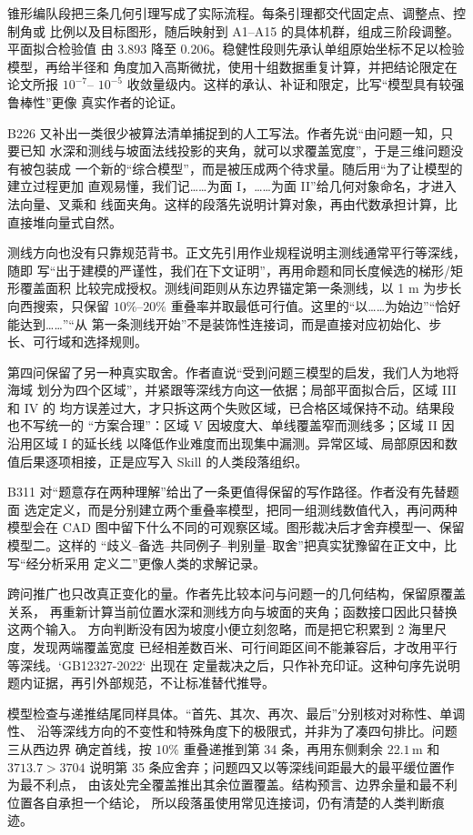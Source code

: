 锥形编队段把三条几何引理写成了实际流程。每条引理都交代固定点、调整点、控制角或
比例以及目标图形，随后映射到 A1--A15 的具体机群，组成三阶段调整。平面拟合检验值
由 $3.893$ 降至 $0.206$。稳健性段则先承认单组原始坐标不足以检验模型，再给半径和
角度加入高斯微扰，使用十组数据重复计算，并把结论限定在论文所报 $10^{-7}$--
$10^{-5}$ 收敛量级内。这样的承认、补证和限定，比写“模型具有较强鲁棒性”更像
真实作者的论证。

B226 又补出一类很少被算法清单捕捉到的人工写法。作者先说“由问题一知，只要已知
水深和测线与坡面法线投影的夹角，就可以求覆盖宽度”，于是三维问题没有被包装成
一个新的“综合模型”，而是被压成两个待求量。随后用“为了让模型的建立过程更加
直观易懂，我们记……为面 I，……为面 II”给几何对象命名，才进入法向量、叉乘和
线面夹角。这样的段落先说明计算对象，再由代数承担计算，比直接堆向量式自然。

测线方向也没有只靠规范背书。正文先引用作业规程说明主测线通常平行等深线，随即
写“出于建模的严谨性，我们在下文证明”，再用命题和同长度候选的梯形/矩形覆盖面积
比较完成授权。测线间距则从东边界锚定第一条测线，以 1 m 为步长向西搜索，只保留
$10\%$--$20\%$ 重叠率并取最低可行值。这里的“以……为始边”“恰好能达到……”“从
第一条测线开始”不是装饰性连接词，而是直接对应初始化、步长、可行域和选择规则。

第四问保留了另一种真实取舍。作者直说“受到问题三模型的启发，我们人为地将海域
划分为四个区域”，并紧跟等深线方向这一依据；局部平面拟合后，区域 III 和 IV 的
均方误差过大，才只拆这两个失败区域，已合格区域保持不动。结果段也不写统一的
“方案合理”：区域 V 因坡度大、单线覆盖窄而测线多；区域 II 因沿用区域 I 的延长线
以降低作业难度而出现集中漏测。异常区域、局部原因和数值后果逐项相接，正是应写入
Skill 的人类段落组织。

B311 对“题意存在两种理解”给出了一条更值得保留的写作路径。作者没有先替题面
选定定义，而是分别建立两个重叠率模型，把同一组测线数值代入，再问两种模型会在
CAD 图中留下什么不同的可观察区域。图形裁决后才舍弃模型一、保留模型二。这样的
“歧义--备选--共同例子--判别量--取舍”把真实犹豫留在正文中，比写“经分析采用
定义二”更像人类的求解记录。

跨问推广也只改真正变化的量。作者先比较本问与问题一的几何结构，保留原覆盖关系，
再重新计算当前位置水深和测线方向与坡面的夹角；函数接口因此只替换这两个输入。
方向判断没有因为坡度小便立刻忽略，而是把它积累到 2 海里尺度，发现两端覆盖宽度
已经相差数百米、可行间距区间不能兼容后，才改用平行等深线。`GB12327-2022` 出现在
定量裁决之后，只作补充印证。这种句序先说明题内证据，再引外部规范，不让标准替代推导。

模型检查与递推结尾同样具体。“首先、其次、再次、最后”分别核对对称性、单调性、
沿等深线方向的不变性和特殊角度下的极限式，并非为了凑四句排比。问题三从西边界
确定首线，按 $10\%$ 重叠递推到第 34 条，再用东侧剩余 $22.1\,\mathrm{m}$ 和
$3713.7>3704$ 说明第 35 条应舍弃；问题四又以等深线间距最大的最平缓位置作为最不利点，
由该处完全覆盖推出其余位置覆盖。结构预言、边界余量和最不利位置各自承担一个结论，
所以段落虽使用常见连接词，仍有清楚的人类判断痕迹。

